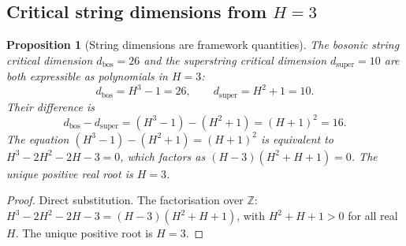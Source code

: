 \documentclass[11pt,a4paper]{article}
\newtheorem{proposition}[theorem]{Proposition}
\theoremstyle{definition}
\theoremstyle{remark}
\newcommand{\Z}{\mathbb{Z}}
\begin{document}
\subsection{Critical string dimensions from $H=3$}\label{sec:string_dims}

\begin{proposition}[String dimensions are framework quantities]\label{prop:string_dims}
The bosonic string critical dimension $d_\mathrm{bos}=26$ and the superstring critical dimension $d_\mathrm{super}=10$ are both expressible as polynomials in $H=3$:
\begin{equation}\label{eq:string_dims}
d_\mathrm{bos} = H^3-1 = 26, \qquad d_\mathrm{super} = H^2+1 = 10.
\end{equation}
Their difference is
\begin{equation}\label{eq:string_diff}
d_\mathrm{bos}-d_\mathrm{super} = (H^3-1)-(H^2+1) = (H+1)^2 = 16.
\end{equation}
The equation $(H^3-1)-(H^2+1)=(H+1)^2$ is equivalent to $H^3-2H^2-2H-3=0$, which factors as $(H-3)(H^2+H+1)=0$. The unique positive real root is $H=3$.
\end{proposition}

\begin{proof}
Direct substitution. The factorisation over $\Z$: $H^3-2H^2-2H-3=(H-3)(H^2+H+1)$, with $H^2+H+1>0$ for all real $H$. The unique positive root is $H=3$.
\end{proof}
\end{document}
